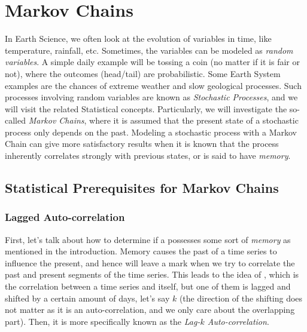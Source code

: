 \chapter{Markov Chains}
\label{chapter:Markov}

In Earth Science, we often look at the evolution of variables in time, like temperature, rainfall, etc. Sometimes, the variables can be modeled as \textit{random variables}. A simple daily example will be tossing a coin (no matter if it is fair or not), where the outcomes (head/tail) are probabilistic. Some Earth System examples are the chances of extreme weather and slow geological processes. Such processes involving random variables are known as \textit{Stochastic Processes}, and we will visit the related Statistical concepts. Particularly, we will investigate the so-called \textit{Markov Chains}, where it is assumed that the present state of a stochastic process only depends on the past. Modeling a stochastic process with a Markov Chain can give more satisfactory results when it is known that the process inherently correlates strongly with previous states, or is said to have \textit{memory}.

\section{Statistical Prerequisites for Markov Chains}

\subsection{Lagged Auto-correlation}

First, let's talk about how to determine if a  possesses some sort of \textit{memory} as mentioned in the introduction. Memory causes the past of a time series to influence the present, and hence will leave a mark when we try to correlate the past and present segments of the time series. This leads to the idea of , which is the correlation between a time series and itself, but one of them is lagged and shifted by a certain amount of days, let's say $k$ (the direction of the shifting does not matter as it is an auto-correlation, and we only care about the overlapping part). Then, it is more specifically known as the \textit{Lag-$k$ Auto-correlation}.

